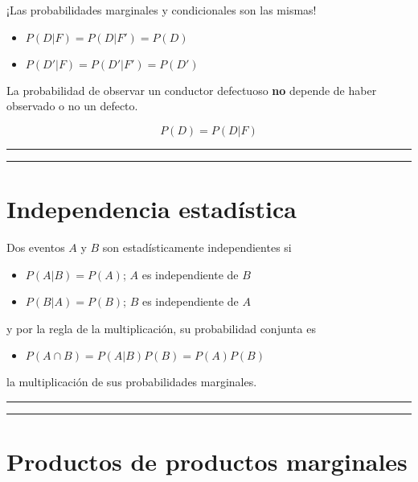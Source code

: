 \documentclass[
]{book}
\providecommand{\tightlist}{%
  \setlength{\itemsep}{0pt}\setlength{\parskip}{0pt}}
\begin{document}
¡Las probabilidades marginales y condicionales son las mismas!

\begin{itemize}
\tightlist
\item
  \(P(D|F)=P(D|F')=P(D)\)
\item
  \(P(D'|F)=P(D'|F')=P(D')\)
\end{itemize}

La probabilidad de observar un conductor defectuoso \textbf{no} depende de haber observado o no un defecto.

\[P(D) = P(D|F)\]

\begin{center}\rule{0.5\linewidth}{0.5pt}\end{center}

\begin{center}\rule{0.5\linewidth}{0.5pt}\end{center}

\hypertarget{independencia-estaduxedstica-3}{%
\section{Independencia estadística}\label{independencia-estaduxedstica-3}}

Dos eventos \(A\) y \(B\) son estadísticamente independientes si

\begin{itemize}
\tightlist
\item
  \(P(A|B)=P(A)\); \(A\) es independiente de \(B\)
\item
  \(P(B|A)=P(B)\); \(B\) es independiente de \(A\)
\end{itemize}

y por la regla de la multiplicación, su probabilidad conjunta es

\begin{itemize}
\tightlist
\item
  \(P(A\cap B)=P(A|B)P(B)=P(A)P(B)\)
\end{itemize}

la multiplicación de sus probabilidades marginales.

\begin{center}\rule{0.5\linewidth}{0.5pt}\end{center}

\begin{center}\rule{0.5\linewidth}{0.5pt}\end{center}

\hypertarget{productos-de-productos-marginales}{%
\section{Productos de productos marginales}\label{productos-de-productos-marginales}}
\end{document}
